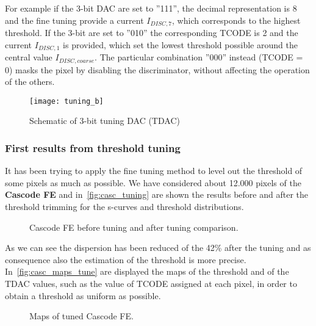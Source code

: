 For example if the 3-bit DAC are set to ''111'', the decimal representation is 8 and the fine tuning provide a current $I_{DISC,7}$, which corresponds to the highest threshold. If the 3-bit are set to ''010'' the corresponding TCODE is 2 and the current $I_{DISC,1}$ is provided,  which set the lowest threshold possible around the central value $I_{DISC,coarse}$. The particular combination ''000'' instead (TCODE = 0) masks the pixel by disabling the discriminator, without affecting the operation of the others.

\begin{figure}
\centering
\texttt{[image: tuning\_b]}
\caption{Schematic of 3-bit tuning DAC (TDAC)}
\label{fig:tdac}
\end{figure}


\subsubsection{First results from threshold tuning}

It has been trying to apply the fine tuning method to level out the threshold of some pixels as much as possible. We have considered about 12.000 pixels of the \textbf{Cascode FE} and in~\autoref{fig:casc_tuning} are shown the results before and after the threshold trimming for the s-curves and threshold distributions.


\begin{figure}[h!]
\centering
{}\quad
{}\quad
{}\quad
\caption{Cascode FE before tuning and after tuning comparison.}
\label{fig:casc_tuning}
\end{figure}

As we can see the dispersion has been reduced of the 42\% after the tuning and as consequence also the estimation of the threshold is more precise. In~\autoref{fig:casc_maps_tune} are displayed the maps of the threshold and of the TDAC values, such as the value of TCODE assigned at each pixel, in order to obtain a threshold as uniform as possible. \\


\begin{figure}[h!]
\centering
{}\quad
{}\quad
\caption{Maps of tuned Cascode FE.}
\label{fig:casc_maps_tune}
\end{figure}


